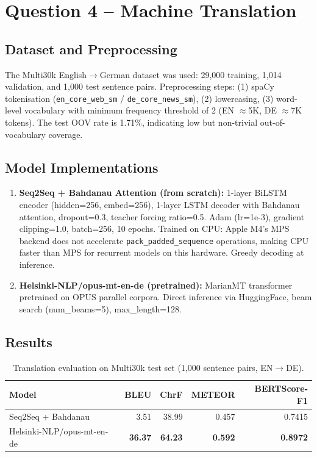 \documentclass[11pt,a4paper]{article}
\begin{document}
\section{Question 4 -- Machine Translation}

\subsection{Dataset and Preprocessing}

The Multi30k English$\to$German dataset was used: 29{,}000 training, 1{,}014 validation, and 1{,}000 test sentence pairs. Preprocessing steps: (1) spaCy tokenisation (\texttt{en\_core\_web\_sm} / \texttt{de\_core\_news\_sm}), (2) lowercasing, (3) word-level vocabulary with minimum frequency threshold of 2 (EN $\approx$5K, DE $\approx$7K tokens). The test OOV rate is 1.71\%, indicating low but non-trivial out-of-vocabulary coverage.

\subsection{Model Implementations}

\begin{enumerate}
    \item \textbf{Seq2Seq + Bahdanau Attention (from scratch):} 1-layer BiLSTM encoder (hidden=256, embed=256), 1-layer LSTM decoder with Bahdanau attention, dropout=0.3, teacher forcing ratio=0.5. Adam (lr=1e-3), gradient clipping=1.0, batch=256, 10 epochs. Trained on CPU: Apple M4's MPS backend does not accelerate \texttt{pack\_padded\_sequence} operations, making CPU faster than MPS for recurrent models on this hardware. Greedy decoding at inference.

    \item \textbf{Helsinki-NLP/opus-mt-en-de (pretrained):} MarianMT transformer pretrained on OPUS parallel corpora. Direct inference via HuggingFace, beam search (num\_beams=5), max\_length=128.
\end{enumerate}

\subsection{Results}

\begin{table}[H]
\centering
\caption{Translation evaluation on Multi30k test set (1{,}000 sentence pairs, EN$\to$DE).}
\label{tab:q4results}
\begin{tabular}{lrrrr}
\toprule
Model & BLEU & ChrF & METEOR & BERTScore-F1 \\
\midrule
Seq2Seq + Bahdanau  &  3.51 & 38.99 & 0.457 & 0.7415 \\
Helsinki-NLP/opus-mt-en-de & \textbf{36.37} & \textbf{64.23} & \textbf{0.592} & \textbf{0.8972} \\
\bottomrule
\end{tabular}
\end{table}
\end{document}
